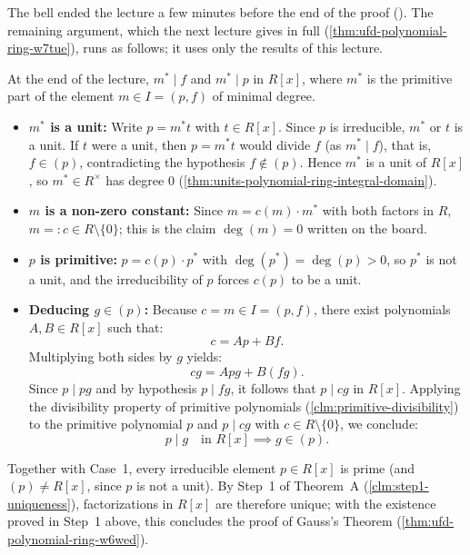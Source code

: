 \begin{proofWrapper}
\begin{aiNote}
The bell ended the lecture a few minutes before the end of the proof (). The remaining argument, which the next lecture gives in full (\cref{thm:ufd-polynomial-ring-w7tue}), runs as follows; it uses only the results of this lecture.
\begin{steps}
At the end of the lecture, $m^* \mid f$ and $m^* \mid p$ in $R[x]$, where $m^*$ is the primitive part of the element $m \in I = (p, f)$ of minimal degree.
\begin{itemize}
    \item \textbf{$m^*$ is a unit:} Write $p = m^* t$ with $t \in R[x]$. Since $p$ is irreducible, $m^*$ or $t$ is a unit. If $t$ were a unit, then $p = m^* t$ would divide $f$ (as $m^* \mid f$), that is, $f \in (p)$, contradicting the hypothesis $f \notin (p)$. Hence $m^*$ is a unit of $R[x]$, so $m^* \in R^\times$ has degree $0$ (\cref{thm:units-polynomial-ring-integral-domain}).
    \item \textbf{$m$ is a non-zero constant:} Since $m = c(m) \cdot m^*$ with both factors in $R$, $m =: c \in R \setminus \{0\}$; this is the claim $\deg(m) = 0$ written on the board.
    \item \textbf{$p$ is primitive:} $p = c(p) \cdot p^*$ with $\deg(p^*) = \deg(p) > 0$, so $p^*$ is not a unit, and the irreducibility of $p$ forces $c(p)$ to be a unit.
    \item \textbf{Deducing $g \in (p)$:} Because $c = m \in I = (p, f)$, there exist polynomials $A, B \in R[x]$ such that:
    \[
    c = A p + B f.
    \]
    Multiplying both sides by $g$ yields:
    \[
    c g = A p g + B (f g).
    \]
    Since $p \mid p g$ and by hypothesis $p \mid f g$, it follows that $p \mid cg$ in $R[x]$.
    Applying the divisibility property of primitive polynomials (\cref{clm:primitive-divisibility}) to the primitive polynomial $p$ and $p \mid c g$ with $c \in R \setminus \{0\}$, we conclude:
    \[
    p \mid g \quad \text{in } R[x] \implies g \in (p).
    \]
\end{itemize}
Together with Case~1, every irreducible element $p \in R[x]$ is prime (and $(p) \neq R[x]$, since $p$ is not a unit). By Step~1 of Theorem~A (\cref{clm:step1-uniqueness}), factorizations in $R[x]$ are therefore unique; with the existence proved in Step~1 above, this concludes the proof of Gauss's Theorem (\cref{thm:ufd-polynomial-ring-w6wed}).
\end{steps}
\end{aiNote}

\end{proofWrapper}


